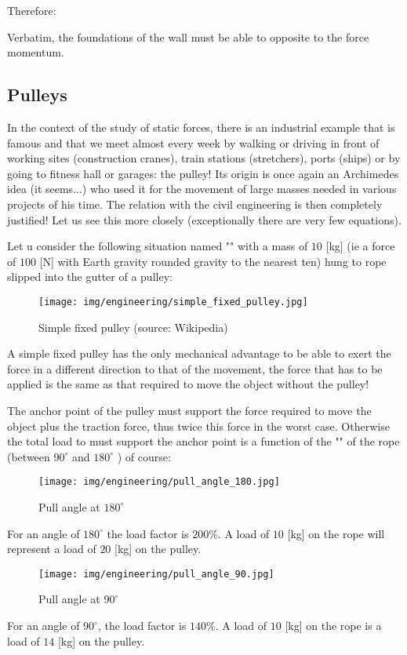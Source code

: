 	Therefore:
	
	Verbatim, the foundations of the wall must be able to opposite to the force momentum.
	
	\pagebreak
	\subsection{Pulleys}
	In the context of the study of static forces, there is an industrial example that is famous and that we meet almost every week by walking or driving in front of working sites (construction cranes), train stations (stretchers), ports (ships) or by going to fitness hall or garages: the pulley! Its origin is once again an Archimedes idea (it seems...) who used it for the movement of large masses needed in various projects of his time. The relation with the civil engineering is then completely justified! Let us see this more closely (exceptionally there are very few equations).
	
	Let u consider the following situation named "" with a mass of $10$ [kg] (ie a force of $100$ [N] with Earth gravity rounded gravity to the nearest ten) hung to rope slipped into the gutter of a pulley:
	\begin{figure}[H]
		\centering
		\texttt{[image: img/engineering/simple\_fixed\_pulley.jpg]}
		\caption{Simple fixed pulley (source: Wikipedia)}
	\end{figure}
	A simple fixed pulley has the only mechanical advantage to be able to exert the force in a different direction to that of the movement, the force that has to be applied is the same as that required to move the object without the pulley!
	
	The anchor point of the pulley must support the force required to move the object plus the traction force, thus twice this force in the worst case. Otherwise the total load to must support the anchor point is a function of the "" of the rope (between $90^{\circ}$ and $180^{\circ}$ ) of course:
	\begin{figure}[H]
		\centering
		\texttt{[image: img/engineering/pull\_angle\_180.jpg]}
		\caption{Pull angle at $180^{\circ}$}
	\end{figure}
	For an angle of $180^{\circ}$ the load factor is $200\%$. A load of $10$ [kg] on the rope will represent a load of $20$ [kg] on the pulley.
	\begin{figure}[H]
		\centering
		\texttt{[image: img/engineering/pull\_angle\_90.jpg]}
		\caption{Pull angle at $90^{\circ}$}
	\end{figure}
	For an angle of $90^{\circ}$, the load factor is $140\%$. A load of $10$ [kg] on the rope is a load of $14$ [kg] on the pulley.
	
